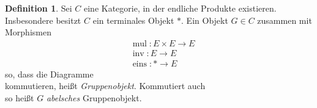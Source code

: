 \documentclass{amsart}
\theoremstyle{plain}
\theoremstyle{definition}
\newtheorem{definition}[subsection]{Definition}
\begin{document}
\begin{definition}
	\label{def-gruppenobjekt}
	Sei $C$ eine Kategorie, in der endliche Produkte existieren. Insbesondere besitzt $C$ ein terminales Objekt $*$.
	Ein Objekt $G \in C$ zusammen mit Morphismen
	\begin{align*}
		& \operatorname{mul} \colon E \times E \rightarrow E \\
		& \operatorname{inv} \colon E \rightarrow E \\
		& \operatorname{eins} \colon * \rightarrow E
	\end{align*}
	so, dass die Diagramme
	\begin{equation*}
	\end{equation*}
	kommutieren, heißt {\it Gruppenobjekt}.
	Kommutiert auch
	\begin{equation*}
	\end{equation*}
	so heißt $G$ {\it abelsches} Gruppenobjekt.
\end{definition}
\end{document}
